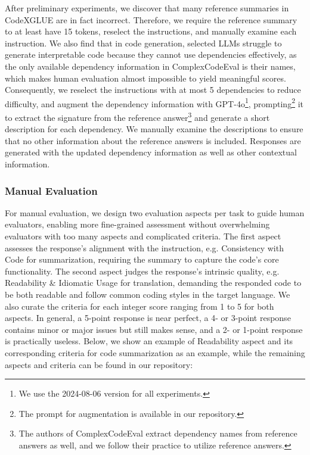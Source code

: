 After preliminary experiments, we discover that many reference summaries in CodeXGLUE are in fact incorrect. Therefore, we require the reference summary to at least have 15 tokens, reselect the instructions, and manually examine each instruction. We also find that in code generation, selected LLMs struggle to generate interpretable code because they cannot use dependencies effectively, as the only available dependency information in ComplexCodeEval is their names, which makes human evaluation almost impossible to yield meaningful scores. Consequently, we reselect the instructions with at most 5 dependencies to reduce difficulty, and augment the dependency information with GPT-4o\footnote{We use the 2024-08-06 version for all experiments.}, prompting\footnote{The prompt for augmentation is available in our repository.} it to extract the signature from the reference answer\footnote{The authors of ComplexCodeEval extract dependency names from reference answers as well, and we follow their practice to utilize reference answers.} and generate a short description for each dependency. We manually examine the descriptions to ensure that no other information about the reference answers is included. Responses are generated with the updated dependency information as well as other contextual information.

\subsubsection{Manual Evaluation}
For manual evaluation, we design two evaluation aspects per task to guide human evaluators, enabling more fine-grained assessment without overwhelming evaluators with too many aspects and complicated criteria. The first aspect assesses the response's alignment with the instruction, e.g. Consistency with Code for summarization, requiring the summary to capture the code's core functionality. The second aspect judges the response's intrinsic quality, e.g. Readability \& Idiomatic Usage for translation, demanding the responded code to be both readable and follow common coding styles in the target language. We also curate the criteria for each integer score ranging from 1 to 5 for both aspects. In general, a 5-point response is near perfect, a 4- or 3-point response contains minor or major issues but still makes sense, and a 2- or 1-point response is practically useless. Below, we show an example of Readability aspect and its corresponding criteria for code summarization as an example, while the remaining aspects and criteria can be found in our repository:

